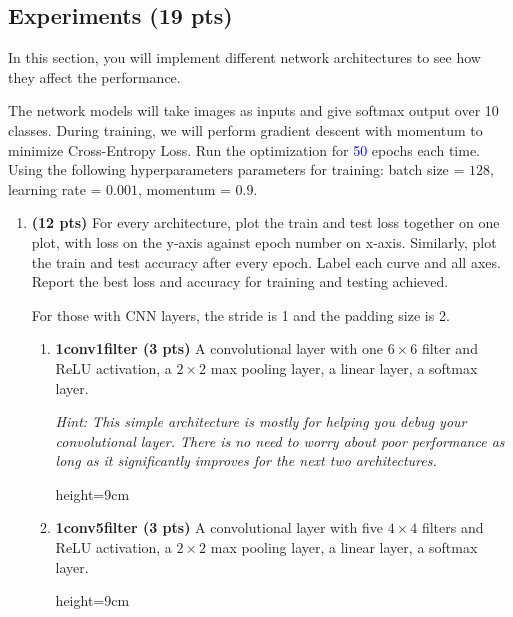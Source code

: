 \subsection{Experiments (19 pts)}
In this section, you will implement different network architectures to see how they affect the performance. 

The network models will take images as inputs and give softmax output over 10 classes. During training, we will perform gradient descent with momentum to minimize Cross-Entropy Loss. Run the optimization for \textcolor{blue}{50} epochs each time. Using the following hyperparameters parameters for training: batch size = $128$, learning rate = $0.001$, momentum = $0.9$. %

\begin{enumerate}
    \item \textbf{(12 pts)} For every architecture, plot the train and test loss together on one plot, with loss on the y-axis against epoch number on x-axis. Similarly, plot the train and test accuracy after every epoch. Label each curve and all axes. Report the best loss and accuracy for training and testing achieved.
    
    For those with CNN layers, the stride is 1 and the padding size is 2.
    
    \pagebreak

    \begin{enumerate}
        \item \textbf{1conv1filter (3 pts)} 
            A convolutional layer with one $6\times6$ filter and ReLU activation, a $2\times2$ max pooling layer, a linear layer, a softmax layer.

            \textit{Hint: This simple architecture is mostly for helping you debug your convolutional layer. There is no need to worry about poor performance as long as  it significantly improves for the next two architectures.}
            
            \begin{soln}{height=9cm}
            \SixBAA
            \end{soln}
            
        \item \textbf{1conv5filter (3 pts)}
            A convolutional layer with five $4\times4$ filters and ReLU activation, a $2\times2$ max pooling layer, a linear layer, a softmax layer.
            
            \begin{soln}{height=9cm}
            \SixBAB   
            \end{soln}
    

\end{enumerate}
\end{enumerate}
